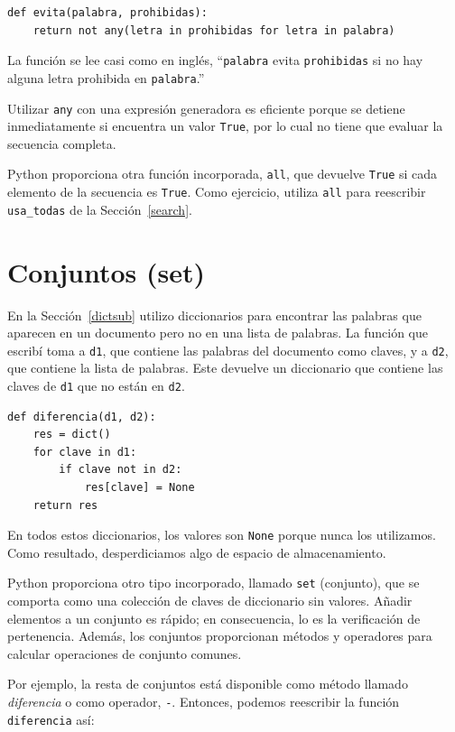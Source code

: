 \documentclass[10pt]{book}
\begin{document}
\begin{verbatim}
def evita(palabra, prohibidas):
    return not any(letra in prohibidas for letra in palabra)
\end{verbatim}
%
La función se lee casi como en inglés, ``{\tt palabra} evita
{\tt prohibidas} si no hay alguna letra prohibida en {\tt palabra}.''

Utilizar {\tt any} con una expresión generadora es eficiente porque
se detiene inmediatamente si encuentra un valor {\tt True},
por lo cual no tiene que evaluar la secuencia completa.

Python proporciona otra función incorporada, {\tt all}, que devuelve
{\tt True} si cada elemento de la secuencia es {\tt True}.  Como
ejercicio, utiliza {\tt all} para reescribir \verb"usa_todas" de la
Sección~\ref{search}.


\section{Conjuntos (set)}
\label{sets}

En la Sección~\ref{dictsub} utilizo diccionarios para encontrar las palabras
que aparecen en un documento pero no en una lista de palabras.  La función
que escribí toma a {\tt d1}, que contiene las palabras del documento
como claves, y a {\tt d2}, que contiene la lista de palabras.  Este
devuelve un diccionario que contiene las claves de {\tt d1} que
no están en {\tt d2}.

\begin{verbatim}
def diferencia(d1, d2):
    res = dict()
    for clave in d1:
        if clave not in d2:
            res[clave] = None
    return res
\end{verbatim}
%
En todos estos diccionarios, los valores son {\tt None} porque
nunca los utilizamos.  Como resultado, desperdiciamos algo de espacio de almacenamiento.

Python proporciona otro tipo incorporado, llamado {\tt set} (conjunto), que
se comporta como una colección de claves de diccionario sin valores.  Añadir
elementos a un conjunto es rápido; en consecuencia, lo es la verificación de pertenencia.  Además, los conjuntos
proporcionan métodos y operadores para calcular operaciones de conjunto comunes.

Por ejemplo, la resta de conjuntos está disponible como método llamado
{\em diferencia} o como operador, {\tt -}.  Entonces, podemos reescribir
la función {\tt diferencia} así:
\end{document}
